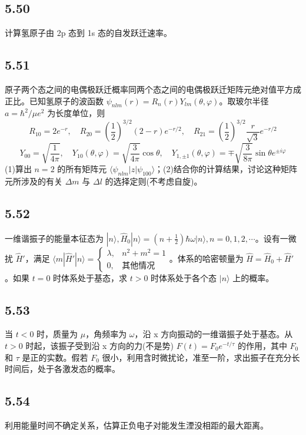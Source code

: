 \subsection{5.50}
计算氢原子由 2p 态到 1s 态的自发跃迁速率。

\subsection{5.51}
原子两个态之间的电偶极跃迁概率同两个态之间的电偶极跃迁矩阵元绝对值平方成正比。已知氢原子的波函数 $\psi_{nlm}(r) = R_n(r) Y_{lm}(\theta, \varphi)$。取玻尔半径 $a = \hbar^2 / \mu e^2$ 为长度单位，则
$$R_{10} = 2e^{-r}, \quad R_{20} = \left( \frac{1}{2} \right)^{3/2} (2 - r)e^{-r/2}, \quad R_{21} = \left( \frac{1}{2} \right)^{3/2} \frac{r}{\sqrt{3}} e^{-r/2}$$
$$Y_{00} = \sqrt{\frac{1}{4\pi}}, \quad Y_{10}(\theta, \varphi) = \sqrt{\frac{3}{4\pi}} \cos \theta, \quad Y_{1,\pm1}(\theta, \varphi) = \mp \sqrt{\frac{3}{8\pi}} \sin \theta e^{\pm i\varphi}$$
(1)算出 $n = 2$ 的所有矩阵元 $\langle \psi_{nlm} | z | \psi_{100} \rangle$；(2)结合你的计算结果，讨论这种矩阵元所涉及的有关 $\Delta m$ 与 $\Delta l$ 的选择定则(不考虑自旋)。

\subsection{5.52}
一维谐振子的能量本征态为 $|n\rangle, \hat{H}_0 |n\rangle = \left( n + \frac{1}{2} \right) \hbar \omega |n\rangle, n = 0, 1, 2, \cdots$。设有一微扰 $\hat{H}'$，满足 $\langle m | \hat{H}' | n \rangle = \begin{cases} \lambda, & n^2 + m^2 = 1 \\ 0, & \text{其他情况} \end{cases}$。体系的哈密顿量为 $\hat{H} = \hat{H}_0 + \hat{H}'$。如果 $t = 0$ 时体系处于基态，求 $t > 0$ 时体系处于各个态 $|n\rangle$ 上的概率。

\subsection{5.53}
当 $t < 0$ 时，质量为 $\mu$，角频率为 $\omega$，沿 x 方向振动的一维谐振子处于基态。从 $t > 0$ 时起，该振子受到沿 x 方向的力(不是势) $F(t) = F_0 e^{-t/\tau}$ 的作用，其中 $F_0$ 和 $\tau$ 是正的实数。假若 $F_0$ 很小，利用含时微扰论，准至一阶，求出振子在充分长时间后，处于各激发态的概率。

\subsection{5.54}
利用能量时间不确定关系，估算正负电子对能发生湮没相距的最大距离。